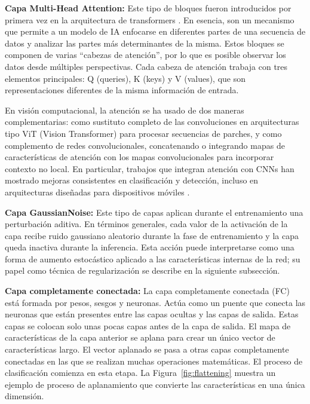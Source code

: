 \textbf{Capa Multi-Head Attention:} Este tipo de bloques fueron introducidos por primera
vez en la arquitectura de transformers . En esencia, son
un mecanismo que permite a un modelo de IA enfocarse en diferentes partes de una
secuencia de datos y analizar las partes más determinantes de la misma. Estos bloques se
componen de varias \enquote{cabezas de atención}, por lo que es posible observar los datos desde
múltiples perspectivas. Cada cabeza de atención trabaja con tres elementos principales: Q
(queries), K (keys) y V (values), que son representaciones diferentes de la misma
información de entrada.

En visión computacional, la atención se ha usado de dos maneras complementarias: como
sustituto completo de las convoluciones en arquitecturas tipo ViT (Vision Transformer)
para procesar secuencias de parches, y como complemento de redes convolucionales,
concatenando o integrando mapas de características de atención con los mapas
convolucionales para incorporar contexto no local. En particular, trabajos que integran
atención con CNNs han mostrado mejoras consistentes en clasificación y detección, incluso
en arquitecturas diseñadas para dispositivos móviles .

\textbf{Capa GaussianNoise:} Este tipo de capas aplican durante el entrenamiento una
perturbación aditiva. En términos generales, cada valor de la activación de la capa
recibe ruido gaussiano aleatorio durante la fase de entrenamiento y la capa queda
inactiva durante la inferencia. Esta acción puede interpretarse como una forma de aumento
estocástico aplicado a las características internas de la red; su papel como técnica de
regularización se describe en la siguiente subsección.

\textbf{Capa completamente conectada:} La capa completamente conectada (FC) está formada
por pesos, sesgos y neuronas. Actúa como un puente que conecta las neuronas que están
presentes entre las capas ocultas y las capas de salida. Estas capas se colocan solo unas
pocas capas antes de la capa de salida. El mapa de características de la capa anterior se
aplana para crear un único vector de características largo. El vector aplanado se pasa a
otras capas completamente conectadas en las que se realizan muchas operaciones
matemáticas. El proceso de clasificación comienza en esta etapa. La
Figura~\ref{fig:flattening} muestra un ejemplo de proceso de aplanamiento que convierte
las características en una única dimensión.

